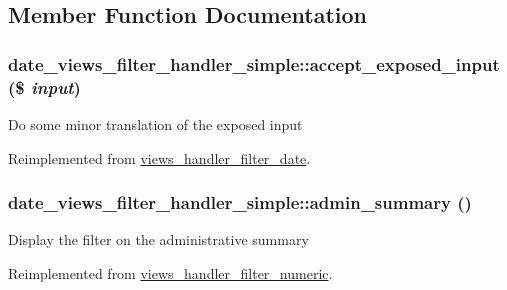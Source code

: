 \subsection{Member Function Documentation}
\hypertarget{classdate__views__filter__handler__simple_af129fdbfc4ec0a307289b09e25bd5190}{
\subsubsection[{accept\_\-exposed\_\-input}]{\setlength{\rightskip}{0pt plus 5cm}date\_\-views\_\-filter\_\-handler\_\-simple::accept\_\-exposed\_\-input (\$ {\em input})}}
\label{classdate__views__filter__handler__simple_af129fdbfc4ec0a307289b09e25bd5190}
Do some minor translation of the exposed input 

Reimplemented from \hyperlink{classviews__handler__filter__date_a063da758bf1832f38454620cbc94e304}{views\_\-handler\_\-filter\_\-date}.\hypertarget{classdate__views__filter__handler__simple_a0eb855c3f94765f6295868b81a27b9c3}{
\subsubsection[{admin\_\-summary}]{\setlength{\rightskip}{0pt plus 5cm}date\_\-views\_\-filter\_\-handler\_\-simple::admin\_\-summary ()}}
\label{classdate__views__filter__handler__simple_a0eb855c3f94765f6295868b81a27b9c3}
Display the filter on the administrative summary 

Reimplemented from \hyperlink{classviews__handler__filter__numeric_aaece85d3c36d4186c871cc55e636f4f2}{views\_\-handler\_\-filter\_\-numeric}.

